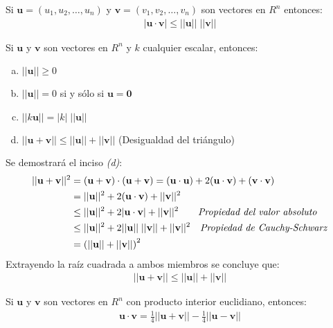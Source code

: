 \documentclass[a4paper,12pt]{article}
\begin{document}
\begin{theorem}
  Si $\mathbf{u}=(u_1,u_2,\ldots,u_n)$ y $\mathbf{v}=(v_1,v_2,\ldots,v_n)$ son
  vectores en $R^n$ entonces:
  \begin{align*}
    |\mathbf{u}\cdot\mathbf{v}|\le||\mathbf{u}||\;||\mathbf{v}||
  \end{align*}
  \label{theo:Cauchy}
\end{theorem}

\begin{theorem}
  Si $\mathbf{u}$ y $\mathbf{v}$ son vectores en $R^n$ y $k$ cualquier
  escalar, entonces:
  \begin{enumerate}[(a)]
    \item $||\mathbf{u}||\ge0$
    \item $||\mathbf{u}||=0$ si y sólo si $\mathbf{u}=\mathbf{0}$
    \item $||k\mathbf{u}||=|k|\;||\mathbf{u}||$
    \item $||\mathbf{u}+\mathbf{v}||\le||\mathbf{u}||+||\mathbf{v}||$
      (Desigualdad del triángulo)
  \end{enumerate}
  \label{theo:prop_long_dist}
\end{theorem}

\demo Se demostrará el inciso \emph{(d)}:
\begin{align*}
  ||\mathbf{u}+\mathbf{v}||^2&=(\mathbf{u}+\mathbf{v})\cdot(\mathbf{u}+\mathbf{v})=(\mathbf{u}\cdot\mathbf{u})+2(\mathbf{u}\cdot\mathbf{v})+(\mathbf{v}\cdot\mathbf{v})\\
  &=||\mathbf{u}||^2+2(\mathbf{u}\cdot\mathbf{v})+||\mathbf{v}||^2 \\
  &\le ||\mathbf{u}||^2+2|\mathbf{u}\cdot\mathbf{v}|+||\mathbf{v}||^2 \qquad
  \mbox{\emph{Propiedad del valor absoluto}}\\
  &\le ||\mathbf{u}||^2+2||\mathbf{u}||\;||\mathbf{v}||+||\mathbf{v}||^2 \quad
  \mbox{\emph{Propiedad de Cauchy-Schwarz}}\\
  &=\left( ||\mathbf{u}||+||\mathbf{v}|| \right)^2
\end{align*}
Extrayendo la raíz cuadrada a ambos miembros se concluye que:
\begin{align*}
  ||\mathbf{u}+\mathbf{v}||\le||\mathbf{u}||+||\mathbf{v}||
\end{align*}

\begin{theorem}
  Si $\mathbf{u}$ y $\mathbf{v}$ son vectores en $R^n$ con producto interior
  euclidiano, entonces:
  \begin{align}
    \mathbf{u}\cdot\mathbf{v}=\tfrac{1}{4}||\mathbf{u}+\mathbf{v}||-\tfrac{1}{4}||\mathbf{u}-\mathbf{v}||
    \label{eqn:alt_prod_int}
  \end{align}
  \label{theo:prop_long_dist}
\end{theorem}
\end{document}
